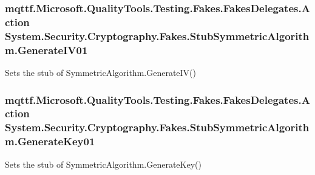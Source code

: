 \hypertarget{class_system_1_1_security_1_1_cryptography_1_1_fakes_1_1_stub_symmetric_algorithm_a207b36bd88675b77b54fa73b8a815080}{
\subsubsection[{Generate\-I\-V01}]{\setlength{\rightskip}{0pt plus 5cm}mqttf.\-Microsoft.\-Quality\-Tools.\-Testing.\-Fakes.\-Fakes\-Delegates.\-Action System.\-Security.\-Cryptography.\-Fakes.\-Stub\-Symmetric\-Algorithm.\-Generate\-I\-V01}}\label{class_system_1_1_security_1_1_cryptography_1_1_fakes_1_1_stub_symmetric_algorithm_a207b36bd88675b77b54fa73b8a815080}


Sets the stub of Symmetric\-Algorithm.\-Generate\-I\-V()

\hypertarget{class_system_1_1_security_1_1_cryptography_1_1_fakes_1_1_stub_symmetric_algorithm_a970fe270162e55fce3199b3cc08b8662}{
\subsubsection[{Generate\-Key01}]{\setlength{\rightskip}{0pt plus 5cm}mqttf.\-Microsoft.\-Quality\-Tools.\-Testing.\-Fakes.\-Fakes\-Delegates.\-Action System.\-Security.\-Cryptography.\-Fakes.\-Stub\-Symmetric\-Algorithm.\-Generate\-Key01}}\label{class_system_1_1_security_1_1_cryptography_1_1_fakes_1_1_stub_symmetric_algorithm_a970fe270162e55fce3199b3cc08b8662}


Sets the stub of Symmetric\-Algorithm.\-Generate\-Key()

